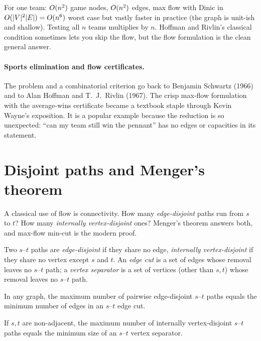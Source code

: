 \begin{complexitybox}
For one team: $O(n^2)$ game nodes, $O(n^2)$ edges, max flow with Dinic in $O(\lvert V\rvert^2\lvert E\rvert) = O(n^6)$ worst case but vastly faster in practice (the graph is unit-ish and shallow). Testing all $n$ teams multiplies by $n$. Hoffman and Rivlin's classical condition sometimes lets you skip the flow, but the flow formulation is the clean general answer.
\end{complexitybox}

\paragraph{Sports elimination and flow certificates.}
The problem and a combinatorial criterion go back to Benjamin Schwartz (1966) and to Alan Hoffman and T.~J.~Rivlin (1967). The crisp max-flow formulation with the average-wins certificate became a textbook staple through Kevin Wayne's exposition. It is a popular example because the reduction is so unexpected: ``can my team still win the pennant'' has no edges or capacities in its statement.

\section{Disjoint paths and Menger's theorem}
\label{ch18:menger}

A classical use of flow is connectivity. How many \emph{edge-disjoint} paths run from $s$ to $t$? How many \emph{internally vertex-disjoint} ones? Menger's theorem answers both, and max-flow min-cut is the modern proof.

\begin{definition}
\label{ch18:def-menger}
Two $s$--$t$ paths are \emph{edge-disjoint} if they share no edge, \emph{internally vertex-disjoint} if they share no vertex except $s$ and $t$. An \emph{edge cut} is a set of edges whose removal leaves no $s$--$t$ path; a \emph{vertex separator} is a set of vertices (other than $s,t$) whose removal leaves no $s$--$t$ path.
\end{definition}

\begin{theorem}
\label{ch18:thm-menger-edge}
In any graph, the maximum number of pairwise edge-disjoint $s$--$t$ paths equals the minimum number of edges in an $s$--$t$ edge cut.
\end{theorem}

\begin{theorem}
\label{ch18:thm-menger-vertex}
If $s,t$ are non-adjacent, the maximum number of internally vertex-disjoint $s$--$t$ paths equals the minimum size of an $s$--$t$ vertex separator.
\end{theorem}

